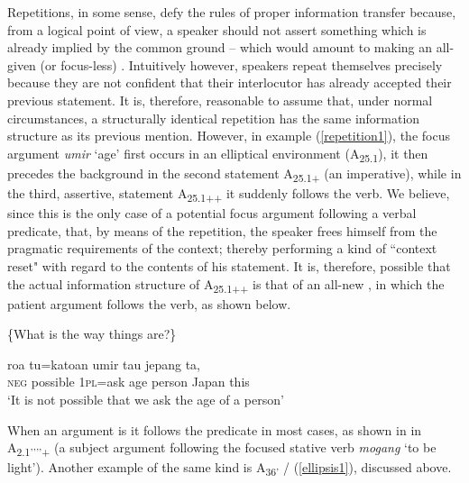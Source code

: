 \documentclass[output=paper
,modfonts
,nonflat]{langsci/langscibook}
\begin{document}
\noindent Repetitions, in some sense, defy the rules of proper information transfer because, from a logical point of view, a speaker should not assert something which is already implied by the common ground -- which would amount to making an all-given (or focus-less) . Intuitively however, speakers repeat themselves precisely because they are not confident that their interlocutor has already accepted their previous statement. It is, therefore, reasonable to assume that, under normal circumstances, a structurally identical repetition has the same information structure as its previous mention. However, in example (\ref{repetition1}), the focus argument \textit{umir} `age' first occurs in an elliptical environment (A\textsubscript{25.1}), it then precedes the background in the second statement A\textsubscript{{25.1+}} (an imperative), while in the third, assertive, statement A\textsubscript{{25.1++}} it suddenly follows the verb. We believe, since this is the only case of a potential focus argument following a  verbal predicate, that, by means of the repetition, the speaker frees himself from the pragmatic requirements of the  context; thereby performing a kind of ``context reset" with regard to the contents of his statement.  It is, therefore, possible that the actual information structure of A\textsubscript{{25.1++}} is that of an all-new , in which the patient argument follows the verb, as shown below. 

\begin{exe}
	\ex\label{repetition2}
	\begin{xlist}
		 \{What is the way things are?\}
	\end{xlist}
	\begin{xlist}[> A:]
		\exi{> A:}
		 roa tu=katoan umir tau jepang {ta,{\cb}\focus{\cb}\sq}\\
		\hphantom{[[}\textsc{neg} possible \textsc{1pl}=ask age person Japan this\\
		\glt `It is not possible that we ask the age of a  person'
	\end{xlist}
\end{exe}

\noindent
When an argument is  it follows the predicate in most  cases, as shown in in A\textsubscript{2.1’’’’+} (a  subject argument following the focused stative verb \textit{mogang} `to be light’). Another example of the same kind is A\textsubscript{{36'}} / (\ref{ellipsis1}), discussed above.
\end{document}
